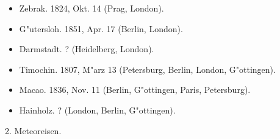\documentclass[a4paper, 11pt, oneside]{article}
\begin{document}
\begin{itemize}
\begin{itemize}
\begin{itemize}
            \item Zebrak. 1824, Okt. 14 (Prag, London).
        
            \item G"utersloh. 1851, Apr. 17 (Berlin, London).
        
            \item Darmstadt. ? (Heidelberg, London).
        
            \item Timochin. 1807, M"arz 13 (Petersburg, Berlin, London, G"ottingen).
        
            \item Macao. 1836, Nov. 11 (Berlin, G"ottingen, Paris, Petersburg).
        
            \item Hainholz. ? (London, Berlin, G"ottingen).
        \end{itemize}
    \end{itemize}
\end{itemize}
\begin{center}
2. Meteoreisen.
\end{center}
\end{document}
